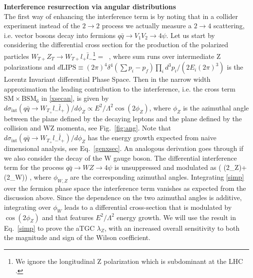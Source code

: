 \noindent
{\bf Interference resurrection via angular distributions}\\
The first way of enhancing the interference term is by noting that in a collider experiment instead of the  $2\to 2$ process we actually measure a $2\to 4$ scattering, i.e. vector bosons decay into fermions $q\bar q\to V_1V_2\to 4 \psi$.  
%
Let us start by considering  the differential cross section for the production of the polarized particles $W_{T+} Z_T \rightarrow W_{T+}  l_+ \bar l_-$\footnote{ We ignore the  longitudinal Z polarization which is subdominant at the LHC \cite{Baur:1994ia}.}
\be
{} =
    
\,  , \label{xsecan}
\ee
where   sum runs over intermediate Z polarizations and $d\text{LIPS}\equiv (2\pi)^4\delta^4(\sum p_i -p_f) \prod_i {d^3 p_i}/\left(2 E_i(2\pi)^3\right)$ is the Lorentz Invariant differential 
Phase Space.  
%
Then in the narrow width approximation the leading contribution to the interference, i.e. the cross term $\text{SM}\times\text{BSM}_6$ in \ref{xsecan},   is given by
$
d\sigma_\text{int}(q\bar q \rightarrow W_{T_+} l_- \bar l_+)/ d\phi_Z \propto E^2/\Lambda^2 \cos(2\phi_Z) 
$, 
where  $\phi_Z$  is the azimuthal angle between the plane defined by the decaying leptons and the plane defined by the collision and WZ momenta, see Fig.~\ref{fig:ang}.  Note that $d\sigma_\text{int}(q\bar q \rightarrow W_{T_+} l_- \bar l_+)/ d\phi_Z $ has the energy growth expected from naive dimensional analysis, see  Eq.~\ref{genxsec}.
An analogous derivation goes through if we also consider the decay of the W gauge boson. The differential interference term   for the process $q\bar q\to WZ\to 4 \psi$ is  unsuppressed and modulated as
\bea
   \propto {}\left( \cos(2\phi_Z)+\cos(2\phi_W)\right) , \label{simp}
\eea
where $\phi_{W,Z}$ are the corresponding azimuthal angles. 
Integrating  \ref{simp} over the fermion phase space the   interference term vanishes as expected from the discussion above. 
Since the dependence on the two azimuthal angles is additive, integrating  over $\phi_W$ leads to a differential cross-section that is modulated by $\cos(2\phi_Z)$ and that features $E^2/\Lambda^2$ energy growth. 
We will use the result in Eq.~\ref{simp}  to prove the aTGC $\lambda_Z$, with an increased  overall sensitivity  to both the magnitude and sign of the Wilson coefficient.


